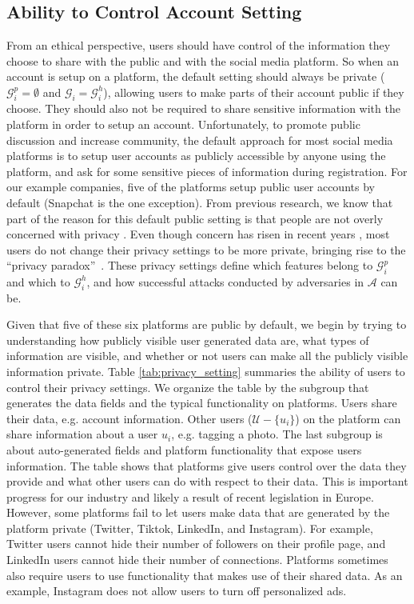 \documentclass[11pt]{article} %
\begin{document}
\subsection{Ability to Control Account Setting}
From an ethical perspective, users should have control of the information they choose to share with the public and with the social media platform. So when an account is setup on a platform, the default setting should always be private ($\mathcal{G}^p_i = \emptyset$ and $\mathcal{G}_i = \mathcal{G}^h_i$), allowing users to make parts of their account public if they choose. They should also not be required to share sensitive information with the platform in order to setup an account. Unfortunately, to promote public discussion and increase community, the default approach for most social media platforms is to setup user accounts as publicly accessible by anyone using the platform, and ask for some sensitive pieces of information during registration. For our example companies, five of the platforms setup public user accounts by default (Snapchat is the one exception). From previous research, we know that part of the reason for this default public setting is that people are not overly concerned with privacy \cite{madden2013teens,SENTHILKUMARN2016114}. Even though concern has risen in recent years \cite{smconcern,smconcern1}, most users do not change their privacy settings to be more private, bringing rise to the ``privacy paradox''~\cite{kokolakis2017,barth2017}. These privacy settings define which features belong to $\mathcal{G}^p_i$ and which to $\mathcal{G}^h_i$, and how successful attacks conducted by adversaries in $\mathcal{A}$ can be.

Given that five of these six platforms are public by default, we begin by trying to understanding how publicly visible user generated data are, what types of information are visible, and whether or not users can make all the publicly visible information private. Table \ref{tab:privacy_setting} summaries the ability of users to control their privacy settings. We organize the table by the subgroup that generates the data fields and the typical functionality on platforms. Users share their data, e.g. account information. Other users ($\mathcal{U}-\{u_i\}$) on the platform can share information about a user $u_i$, e.g. tagging a photo. The last subgroup is about auto-generated fields and platform functionality that expose users information. The table shows that platforms give users control over the data they provide and what other users can do with respect to their data. This is important progress for our industry and likely a result of recent legislation in Europe. However, some platforms fail to let users make data that are generated by the platform private (Twitter, Tiktok, LinkedIn, and Instagram). For example, Twitter users cannot hide their number of followers on their profile page, and LinkedIn users cannot hide their number of connections. 
Platforms sometimes also require users to use functionality that makes use of their shared data. As an example, Instagram does not allow users to turn off personalized ads. 
\end{document}

